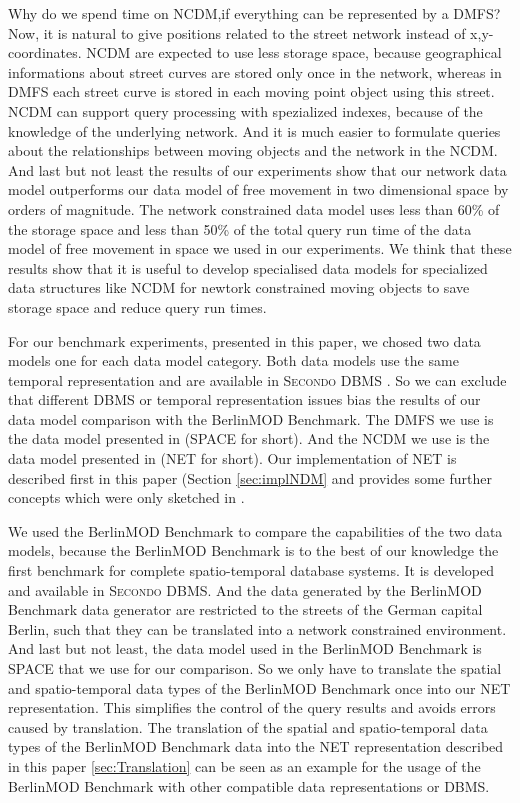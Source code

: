 \documentclass[a4paper]{article}
\newcommand{\secondo}{\textsc{Secondo}}
\newcommand{\bmodb} {BerlinMOD Benchmark}
\begin{document}
Why do we spend time on NCDM,if everything can be represented by
a DMFS? Now, it is natural to give positions related to the street
network instead of x,y-coordinates. NCDM are expected to use less storage space,
because geographical informations about street curves are stored only once in
the network, whereas in DMFS each street curve is stored in each moving point
object using this street. NCDM can support query processing with spezialized indexes,
because of the knowledge of the underlying network. And it is much easier to
formulate queries about the relationships between moving objects and the network
in the NCDM. And last but not least the results of our experiments show that
our network data model outperforms our data model of free movement in two dimensional
space by orders of magnitude. The network constrained data model uses less than
60\% of the storage space and less than 50\% of the total query run time of the
data model of free movement in space we used in our experiments.
We think that these results show that it is useful
to develop specialised data models for specialized data structures like NCDM for
newtork constrained moving objects to save storage space and reduce query run times.

For our benchmark experiments, presented in this paper, we chosed two data models
one for each data model category. Both data models use the same temporal representation
and are available in \secondo{} DBMS
\cite{SecondoEnvironmentDieker,SecondoPlatformPrototypingGueting}.
So we can exclude that different DBMS or temporal
representation issues bias the results of our data model comparison with the
\bmodb{}\cite{BerlinMODVLDBDuentgen}.
The DMFS we use is the data model presented in \cite{DataModelDataStructureGueting}
(SPACE for short).
And the NCDM we use is the data model presented in \cite{NetworkGueting} (NET for short).
Our implementation of NET is described first in this paper (Section \ref{sec:implNDM}
and provides some further concepts which were only sketched in \cite{NetworkGueting}.

We used the \bmodb{} \cite{BerlinMODVLDBDuentgen} to compare the capabilities of
the two data models, because the \bmodb{} is to the best of our knowledge the
first benchmark for complete spatio-temporal database systems.
It is developed and available in \secondo{} DBMS. And the data generated by the
\bmodb{} data generator are restricted to the streets of the German capital Berlin,
such that they can be translated into a network constrained environment.
And last but not least, the data model used in the \bmodb{} is SPACE that we use
for our comparison. So we only have to translate the spatial and spatio-temporal
data types of the \bmodb{} once into our NET representation. This simplifies the
control of the query results and avoids errors caused by translation.
The translation of the spatial and spatio-temporal data types of the \bmodb{} data
into the NET representation described in this paper \ref{sec:Translation} can be
seen as an example for the usage of the \bmodb{} with other compatible data
representations or DBMS.
\end{document}
